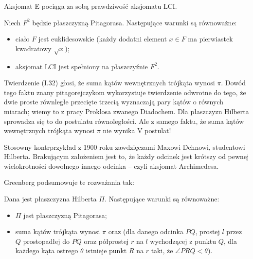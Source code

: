 Aksjomat E pociąga za sobą prawdziwość aksjomatu LCI.

\begin{proposition}
    Niech $F^2$ będzie płaszczyzną Pitagorasa.
    Następujące warunki są równoważne:
    \begin{itemize}
        \item ciało $F$ jest euklidesowskie (każdy dodatni element $x \in F$ ma pierwiastek kwadratowy $\sqrt{x}$);
        \item aksjomat LCI jest spełniony na płaszczyźnie $F^2$.
    \end{itemize}
\end{proposition}

Twierdzenie (I.32) głosi, że suma kątów wewnętrznych trójkąta wynosi $\pi$.
Dowód tego faktu znany pitagorejczykom wykorzystuje twierdzenie odwrotne do tego, że dwie proste równległe przecięte trzecią wyznaczają pary kątów o równych miarach; wiemy to z pracy Proklosa zwanego Diadochem.
Dla płaszczyzn Hilberta sprowadza się to do postulatu równoległości.
Ale z samego faktu, że suma kątów wewnętrznych trójkąta wynosi $\pi$ nie wynika V postulat!

Stosowny kontrprzykład z 1900 roku zawdzięczami Maxowi Dehnowi, studentowi Hilberta.
Brakującym założeniem jest to, że każdy odcinek jest krótszy od pewnej wielokrotności dowolnego innego odcinka -- czyli aksjomat Archimedesa.

Greenberg podsumowuje te rozważania tak:

\begin{proposition}
    Dana jest płaszczyzna Hilberta $\Pi$.
    Następujące warunki są równoważne:
    \begin{itemize}
        \item $\Pi$ jest płaszczyzną Pitagorasa;
        \item suma kątów trójkąta wynosi $\pi$ oraz (dla danego odcinka $PQ$, prostej $l$ przez $Q$ prostopadłej do $PQ$ oraz półprostej $r$ na $l$ wychodzącej z punktu $Q$, dla każdego kąta ostrego $\theta$ istnieje punkt $R$ na $r$ taki, że $\angle PRQ < \theta$).
    \end{itemize}
\end{proposition}

%